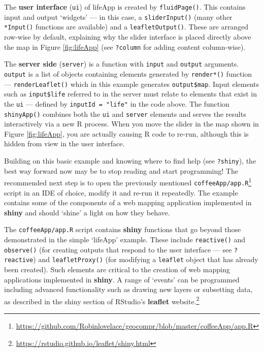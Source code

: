 \documentclass[]{krantz}
\let\rmarkdownfootnote\footnote%
\def\footnote{\protect\rmarkdownfootnote}
\renewcommand{\href}[2]{#2\footnote{\url{#1}}}
\begin{document}
The \textbf{user interface} (\texttt{ui}) of lifeApp is created by \texttt{fluidPage()}.
This contains input and output `widgets' --- in this case, a \texttt{sliderInput()} (many other \texttt{*Input()} functions are available) and a \texttt{leafletOutput()}.
These are arranged row-wise by default, explaining why the slider interface is placed directly above the map in Figure \ref{fig:lifeApp} (see \texttt{?column} for adding content column-wise).

The \textbf{server side} (\texttt{server}) is a function with \texttt{input} and \texttt{output} arguments.
\texttt{output} is a list of objects containing elements generated by \texttt{render*()} function --- \texttt{renderLeaflet()} which in this example generates \texttt{output\$map}.
Input elements such as \texttt{input\$life} referred to in the server must relate to elements that exist in the \texttt{ui} --- defined by \texttt{inputId\ =\ "life"} in the code above.
The function \texttt{shinyApp()} combines both the \texttt{ui} and \texttt{server} elements and serves the results interactively via a new R process.
When you move the slider in the map shown in Figure \ref{fig:lifeApp}, you are actually causing R code to re-run, although this is hidden from view in the user interface.

Building on this basic example and knowing where to find help (see \texttt{?shiny}), the best way forward now may be to stop reading and start programming!
The recommended next step is to open the previously mentioned \href{https://github.com/Robinlovelace/geocompr/blob/master/coffeeApp/app.R}{\texttt{coffeeApp/app.R}} script in an IDE of choice, modify it and re-run it repeatedly.
The example contains some of the components of a web mapping application implemented in \textbf{shiny} and should `shine' a light on how they behave.

The \texttt{coffeeApp/app.R} script contains \textbf{shiny} functions that go beyond those demonstrated in the simple `lifeApp' example.
These include \texttt{reactive()} and \texttt{observe()} (for creating outputs that respond to the user interface --- see \texttt{?reactive}) and \texttt{leafletProxy()} (for modifying a \texttt{leaflet} object that has already been created).
Such elements are critical to the creation of web mapping applications implemented in \textbf{shiny}.
A range of `events' can be programmed including advanced functionality such as drawing new layers or subsetting data, as described in the shiny section of RStudio's \textbf{leaflet} \href{https://rstudio.github.io/leaflet/shiny.html}{website.}
\end{document}
